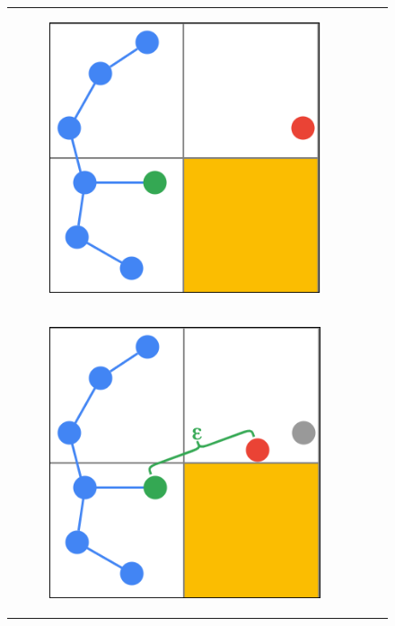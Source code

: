 \begin{figure}[H]
\begin{centering}
\begin{tabular}{ccc}
    \begin{subfigure}{0.3\linewidth}
    \includegraphics[width=\linewidth]{chapters/chapter2/img/keyfunctions/functions3.png}
    \caption{}
    \end{subfigure} \\

    \begin{subfigure}{0.3\linewidth}
    \includegraphics[width=\linewidth]{chapters/chapter2/img/keyfunctions/functions4.png}
    \caption{}
    \end{subfigure} &


\end{tabular}
\end{centering}
\end{figure}
